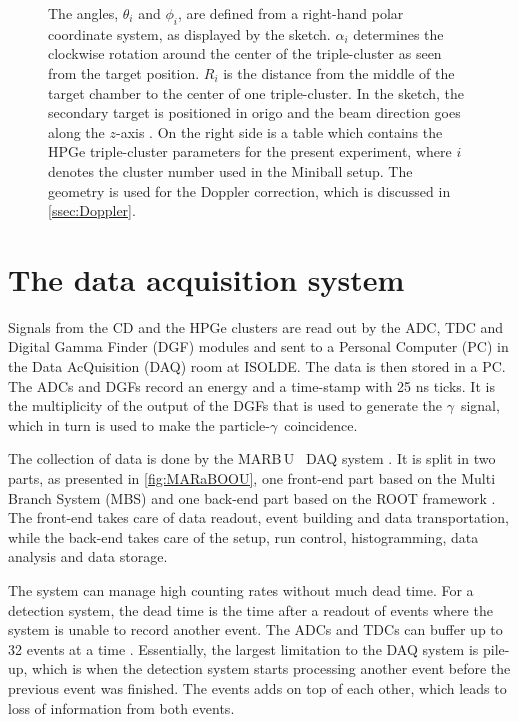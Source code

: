 \documentclass[twoside,english]{uiofysmaster/uiofysmaster}
\newcommand{\ga}{$\gamma$}
\newcommand{\MBOU}{MAR\belowbaseline[-2pt]{a}B\stackinset{l}{3pt}{b}{-3pt}{O}{O}\,U}
\let\orgautoref\autoref
\renewcommand{\autoref}
        {%
		 \def\sectionautorefname{Section}%
		 \def\subsectionautorefname{Section}%
		 \def\subsubsectionautorefname{Section}%
		 \def\chapterautorefname{Chapter}%
          \orgautoref}
\begin{document}
\begin{figure}[ht]
{	The angles, $\theta_i$ and $\phi_i$, are defined from a right-hand polar coordinate system, as displayed by the sketch.
	$\alpha_i$ determines the clockwise rotation around the center of the triple-cluster as seen from the target position.
	$R_i$ is the distance from the middle of the target chamber to the center of one triple-cluster.
	In the sketch, the secondary target is positioned in origo and the beam direction goes along the $z$-axis \cite{NWarr-Angles, Rosiak}. 
	On the right side is a table which contains the HPGe triple-cluster parameters for the present experiment, where $i$ denotes the cluster number used in the Miniball setup. 
	The geometry is used for the Doppler correction, which is discussed in \autoref{ssec:Doppler}.}
	\label{fig:HPGe}
\end{figure}


\section{The data acquisition system}\label{sec:DAQ}
Signals from the CD and the HPGe clusters are read out by the ADC, TDC and Digital Gamma Finder (DGF) modules and sent to a Personal Computer (PC) in the Data AcQuisition (DAQ) room at ISOLDE. 
The data is then stored in a PC. 
The ADCs and DGFs record an energy and a time-stamp with 25 ns ticks. 
It is the multiplicity of the output of the DGFs that is used to generate the \ga\ signal, which in turn is used to make the particle-\ga\ coincidence.

The collection of data is done by the \MBOU\ \cite{Maraboou, Maraboou-web} DAQ system \cite{MB-spect}. 
It is split in two parts, as presented in \autoref{fig:MARaBOOU}, one front-end part based on the Multi Branch System (MBS) \cite{MBS} and one back-end part based on the ROOT framework \cite{ROOT}.
The front-end takes care of data readout, event building and data transportation, while the back-end takes care of the setup, run control, histogramming, data analysis and data storage. 

The system can manage high counting rates without much dead time. 
For a detection system, the dead time is the time after a readout of events where the system is unable to record another event. 
The ADCs and TDCs can buffer up to 32 events at a time \cite{MB-spect}. 
Essentially, the largest limitation to the DAQ system is pile-up, which is when the detection system starts processing another event before the previous event was finished. 
The events adds on top of each other, which leads to loss of information from both events.
\end{document}

